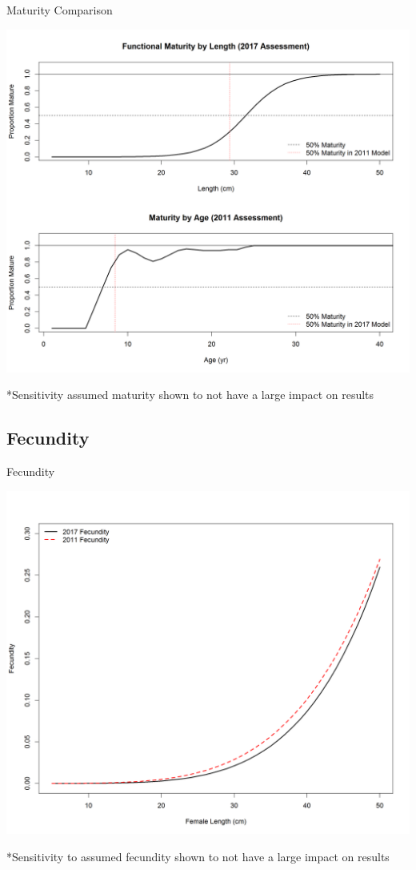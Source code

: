 \documentclass[pdf]{beamer}\usepackage[]{graphicx}\usepackage[]{color}
\begin{document}
\begin{frame}{Maturity Comparison}
  \begin{center}
    \includegraphics[scale = 0.32]{figures/Maturity_Comparison.png}
  \end{center}
  *Sensitivity assumed maturity shown to not have a large impact on results
\end{frame}

\subsection{Fecundity}
\begin{frame}{Fecundity}
  \begin{center}
    \includegraphics[scale = 0.3, trim={0, 0, 1cm, 1cm}, clip]{figures/Fecundity_Comparison.png}
  \end{center}
  *Sensitivity to assumed fecundity shown to not have a large impact on results
\end{frame}
\end{document}
